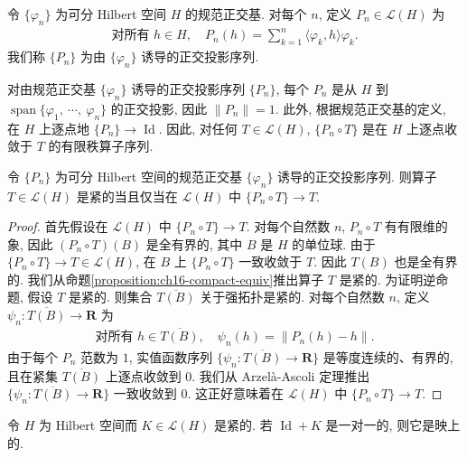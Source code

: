 \documentclass[../../main.tex]{subfiles}
\begin{document}
\begin{definition}[正交投影序列]\label{definition:ch16-proj-sequence}
令 $\{\varphi_{n}\}$ 为可分 Hilbert 空间 $H$ 的规范正交基. 对每个 $n$, 定义 $P_{n}\in\mathcal{L}(H)$ 为
\begin{align*}
\text{对所有 }h\in H,\quad P_{n}(h)=\sum_{k=1}^{n}\langle\varphi_{k},h\rangle\varphi_{k}.
\end{align*}
我们称 $\{P_{n}\}$ 为由 $\{\varphi_{n}\}$ 诱导的正交投影序列.
\end{definition}

对由规范正交基 $\{\varphi_{n}\}$ 诱导的正交投影序列 $\{P_{n}\}$, 每个 $P_{n}$ 是从 $H$ 到 $\operatorname{span}\{\varphi_{1},\ \cdots,\ \varphi_{n}\}$ 的正交投影, 因此 $\|P_{n}\|=1$. 此外, 根据规范正交基的定义, 在 $H$ 上逐点地 $\{P_{n}\}\to\operatorname{Id}$. 因此, 对任何 $T\in\mathcal{L}(H)$, $\{P_{n}\circ T\}$ 是在 $H$ 上逐点收敛于 $T$ 的有限秩算子序列.

\begin{proposition}\label{proposition:ch16-finite-rank-approx}
令 $\{P_{n}\}$ 为可分 Hilbert 空间的规范正交基 $\{\varphi_{n}\}$ 诱导的正交投影序列. 则算子 $T\in\mathcal{L}(H)$ 是紧的当且仅当在 $\mathcal{L}(H)$ 中 $\{P_{n}\circ T\}\to T$.
\end{proposition}

\begin{proof}
首先假设在 $\mathcal{L}(H)$ 中 $\{P_{n}\circ T\}\to T$. 对每个自然数 $n$, $P_{n}\circ T$ 有有限维的象, 因此 $(P_{n}\circ T)(B)$ 是全有界的, 其中 $B$ 是 $H$ 的单位球. 由于 $\{P_{n}\circ T\}\to T\in\mathcal{L}(H)$, 在 $B$ 上 $\{P_{n}\circ T\}$ 一致收敛于 $T$. 因此 $T(B)$ 也是全有界的. 我们从命题\cref{proposition:ch16-compact-equiv}推出算子 $T$ 是紧的. 为证明逆命题, 假设 $T$ 是紧的. 则集合 $\overline{T(B)}$ 关于强拓扑是紧的. 对每个自然数 $n$, 定义 $\psi_{n}:\overline{T(B)}\to\mathbf{R}$ 为
\begin{align*}
\text{对所有 }h\in\overline{T(B)},\quad\psi_{n}(h)=\|P_{n}(h)-h\|.
\end{align*}
由于每个 $P_{n}$ 范数为 $1$, 实值函数序列 $\{\psi_{n}:\overline{T(B)}\to\mathbf{R}\}$ 是等度连续的、有界的, 且在紧集 $\overline{T(B)}$ 上逐点收敛到 $0$. 我们从 Arzel\`a-Ascoli 定理推出 $\{\psi_{n}:\overline{T(B)}\to\mathbf{R}\}$ 一致收敛到 $0$. 这正好意味着在 $\mathcal{L}(H)$ 中 $\{P_{n}\circ T\}\to T$.
\end{proof}

\begin{proposition}\label{proposition:ch16-idplusK-onto}
令 $H$ 为 Hilbert 空间而 $K\in\mathcal{L}(H)$ 是紧的. 若 $\operatorname{Id}+K$ 是一对一的, 则它是映上的.
\end{proposition}
\end{document}
